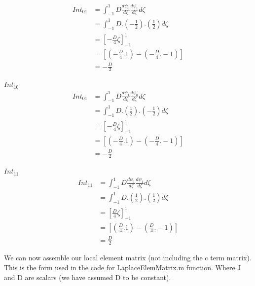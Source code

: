 \documentclass[11pt]{article}
\begin{document}
\begin{equation}\label{eq:Int01}
\begin{split}
 Int_{01} &= \int_{-1}^{1} D \frac{d\psi_{0}}{d\zeta} \frac{d\psi_{1}}{d \zeta} d \zeta \\
&=  \int_{-1}^{1} D .( -\frac{1}{2}). (\frac{1}{2}) d\zeta \\
& = \left[-\frac{D}{4} \zeta \right]_{-1}^{1} \\
& = \left[ (-\frac{D}{4}.1) - (-\frac{D}{4}.-1) \right] \\
& = -\frac{D}{2}
\end{split}
\end{equation}

\underline{$Int_{10}$} \\


\begin{equation}\label{eq:Int10}
\begin{split}
 Int_{01} &= \int_{-1}^{1} D \frac{d\psi_{1}}{d\zeta} \frac{d\psi_{0}}{d \zeta} d \zeta \\
&=  \int_{-1}^{1} D .( \frac{1}{2}). (-\frac{1}{2}) d\zeta \\
& = \left[-\frac{D}{4} \zeta \right]_{-1}^{1} \\
& = \left[ (-\frac{D}{4}.1) - (-\frac{D}{4}.-1) \right] \\
& = -\frac{D}{2}
\end{split}
\end{equation}


\clearpage

\underline{$Int_{11}$} \\


\begin{equation}\label{eq:Int11}
\begin{split}
 Int_{11} &= \int_{-1}^{1} D \frac{d\psi_{1}}{d\zeta} \frac{d\psi_{1}}{d \zeta} d \zeta \\
&=  \int_{-1}^{1} D .( \frac{1}{2}). (\frac{1}{2}) d\zeta \\
& = \left [\frac{D}{4} \zeta \right ]_{-1}^{1} \\
& = \left [ (\frac{D}{4}.1) - (\frac{D}{4}.-1) \right ] \\
& = \frac{D}{2}
\end{split}
\end{equation}

We can now assemble our local element matrix (not including the c term matrix). This is the form used in the code for LaplaceElemMatrix.m function. Where J and D are scalars (we have assumed D to be constant).
\end{document}
